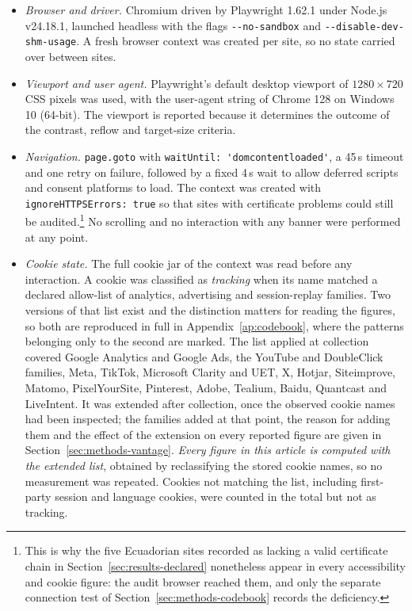 \documentclass[]{interact}
\begin{document}
\begin{itemize}
	\item \emph{Browser and driver.} Chromium driven by Playwright 1.62.1 \citep{playwright2026} under Node.js v24.18.1, launched headless with the flags \verb|--no-sandbox| and \verb|--disable-dev-shm-usage|. A fresh browser context was created per site, so no state carried over between sites.
	\item \emph{Viewport and user agent.} Playwright's default desktop viewport of $1280 \times 720$ CSS pixels was used, with the user-agent string of Chrome 128 on Windows 10 (64-bit). The viewport is reported because it determines the outcome of the contrast, reflow and target-size criteria.
	\item \emph{Navigation.} \verb|page.goto| with \verb|waitUntil: 'domcontentloaded'|, a 45\,s timeout and one retry on failure, followed by a fixed 4\,s wait to allow deferred scripts and consent platforms to load. The context was created with \verb|ignoreHTTPSErrors: true| so that sites with certificate problems could still be audited.\footnote{This is why the five Ecuadorian sites recorded as lacking a valid certificate chain in Section~\ref{sec:results-declared} nonetheless appear in every accessibility and cookie figure: the audit browser reached them, and only the separate connection test of Section~\ref{sec:methods-codebook} records the deficiency.} No scrolling and no interaction with any banner were performed at any point.
	\item \emph{Cookie state.} The full cookie jar of the context was read before any interaction. A cookie was classified as \emph{tracking} when its name matched a declared allow-list of analytics, advertising and session-replay families. Two versions of that list exist and the distinction matters for reading the figures, so both are reproduced in full in Appendix~\ref{ap:codebook}, where the patterns belonging only to the second are marked. The list applied at collection covered Google Analytics and Google Ads, the YouTube and DoubleClick families, Meta, TikTok, Microsoft Clarity and UET, X, Hotjar, Siteimprove, Matomo, PixelYourSite, Pinterest, Adobe, Tealium, Baidu, Quantcast and LiveIntent. It was extended after collection, once the observed cookie names had been inspected; the families added at that point, the reason for adding them and the effect of the extension on every reported figure are given in Section~\ref{sec:methods-vantage}. \emph{Every figure in this article is computed with the extended list}, obtained by reclassifying the stored cookie names, so no measurement was repeated. Cookies not matching the list, including first-party session and language cookies, were counted in the total but not as tracking.

\end{itemize}
\end{document}
